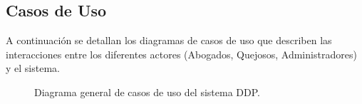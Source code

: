 
\begin{appendices}

\chapter{Casos de Uso}
\label{anexo:casos_uso}

A continuación se detallan los diagramas de casos de uso que describen las interacciones entre los diferentes actores (Abogados, Quejosos, Administradores) y el sistema.

\begin{figure}[htbp]
    \centering
    \caption{Diagrama general de casos de uso del sistema DDP.}
    \label{fig:casos_uso_general}
\end{figure}


\end{appendices}